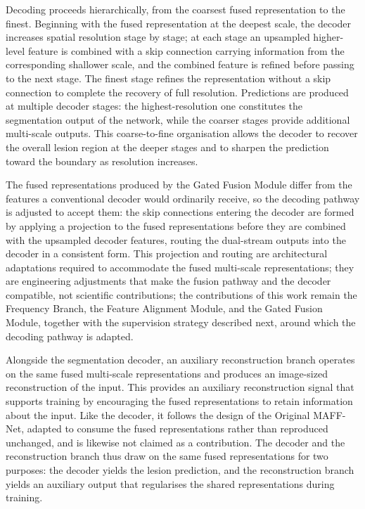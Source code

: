 Decoding proceeds hierarchically, from the coarsest fused representation to the finest. Beginning with the fused representation at the deepest scale, the decoder increases spatial resolution stage by stage; at each stage an upsampled higher-level feature is combined with a skip connection carrying information from the corresponding shallower scale, and the combined feature is refined before passing to the next stage. The finest stage refines the representation without a skip connection to complete the recovery of full resolution. Predictions are produced at multiple decoder stages: the highest-resolution one constitutes the segmentation output of the network, while the coarser stages provide additional multi-scale outputs. This coarse-to-fine organisation allows the decoder to recover the overall lesion region at the deeper stages and to sharpen the prediction toward the boundary as resolution increases.

The fused representations produced by the Gated Fusion Module differ from the features a conventional decoder would ordinarily receive, so the decoding pathway is adjusted to accept them: the skip connections entering the decoder are formed by applying a projection to the fused representations before they are combined with the upsampled decoder features, routing the dual-stream outputs into the decoder in a consistent form. This projection and routing are architectural adaptations required to accommodate the fused multi-scale representations; they are engineering adjustments that make the fusion pathway and the decoder compatible, not scientific contributions; the contributions of this work remain the Frequency Branch, the Feature Alignment Module, and the Gated Fusion Module, together with the supervision strategy described next, around which the decoding pathway is adapted.

Alongside the segmentation decoder, an auxiliary reconstruction branch operates on the same fused multi-scale representations and produces an image-sized reconstruction of the input. This provides an auxiliary reconstruction signal that supports training by encouraging the fused representations to retain information about the input. Like the decoder, it follows the design of the Original MAFF-Net, adapted to consume the fused representations rather than reproduced unchanged, and is likewise not claimed as a contribution. The decoder and the reconstruction branch thus draw on the same fused representations for two purposes: the decoder yields the lesion prediction, and the reconstruction branch yields an auxiliary output that regularises the shared representations during training.

